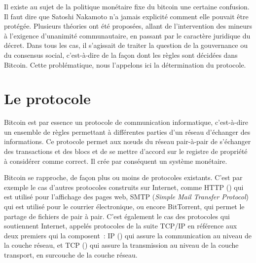 Il existe au sujet de la politique monétaire fixe du bitcoin une certaine confusion. Il faut dire que Satoshi Nakamoto n'a jamais explicité comment elle pouvait être protégée. Plusieurs théories ont été proposées, allant de l'intervention des mineurs à l'exigence d'unanimité communautaire, en passant par le caractère juridique du décret. Dans tous les cas, il s'agissait de traiter la question de la gouvernance ou du consensus social, c'est-à-dire de la façon dont les règles sont décidées dans Bitcoin. Cette problématique, nous l'appelons ici la détermination du protocole.

\section*{Le protocole}

Bitcoin est par essence un protocole de communication informatique, c'est-à-dire un ensemble de règles permettant à différentes parties d'un réseau d'échanger des informations. Ce protocole permet aux nœuds du réseau pair-à-pair de s'échanger des transactions et des blocs et de se mettre d'accord sur le registre de propriété à considérer comme correct. Il crée par conséquent un système monétaire.

Bitcoin se rapproche, de façon plus ou moins de protocoles existants. C'est par exemple le cas d'autres protocoles construits sur Internet, comme HTTP () qui est utilisé pour l'affichage des pages web, SMTP (\emph{Simple Mail Transfer Protocol}) qui est utilisé pour le courrier électronique, ou encore BitTorrent, qui permet le partage de fichiers de pair à pair. C'est également le cas des protocoles qui soutiennent Internet, appelés protocoles de la suite TCP/IP en référence aux deux premiers qui la composent~: IP () qui assure la communication au niveau de la couche réseau, et TCP () qui assure la transmission au niveau de la couche transport, en surcouche de la couche réseau.

